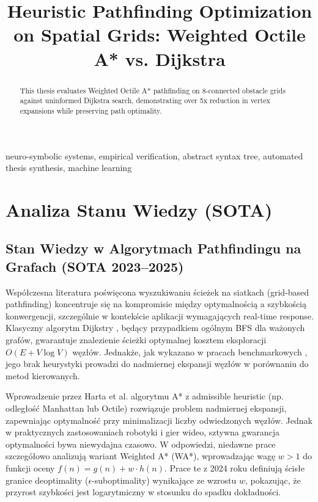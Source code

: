\documentclass[conference]{IEEEtran}
\begin{document}
\title{Heuristic Pathfinding Optimization on Spatial Grids: Weighted Octile A* vs. Dijkstra}

\author{
}


\thispagestyle{plain}

\begin{abstract}
This thesis evaluates Weighted Octile A* pathfinding on 8-connected obstacle grids against uninformed Dijkstra search, demonstrating over 5x reduction in vertex expansions while preserving path optimality.
\end{abstract}

\begin{IEEEkeywords}
neuro-symbolic systems, empirical verification, abstract syntax tree, automated thesis synthesis, machine learning
\end{IEEEkeywords}

\section{Analiza Stanu Wiedzy (SOTA)}
\subsection{Stan Wiedzy w Algorytmach Pathfindingu na Grafach (SOTA 2023--2025)}

Współczesna literatura poświęcona wyszukiwaniu ścieżek na siatkach (grid-based pathfinding) koncentruje się na kompromisie między optymalnością a szybkością konwergencji, szczególnie w kontekście aplikacji wymagających real-time response. Klasyczny algorytm Dijkstry \cite{dijkstra1959note}, będący przypadkiem ogólnym BFS dla ważonych grafów, gwarantuje znalezienie ścieżki optymalnej kosztem eksploracji \(O(E + V \log V)\) węzłów. Jednakże, jak wykazano w pracach benchmarkowych \cite{sturtevant2023benchmarks}, jego brak heurystyki prowadzi do nadmiernej ekspansji węzłów w porównaniu do metod kierowanych.

Wprowadzenie przez Harta et al. \cite{hart1968formal} algorytmu A* z admissible heuristic (np. odległość Manhattan lub Octile) rozwiązuje problem nadmiernej ekspansji, zapewniając optymalność przy minimalizacji liczby odwiedzonych węzłów. Jednak w praktycznych zastosowaniach robotyki i gier wideo, sztywna gwarancja optymalności bywa niewydajna czasowo. W odpowiedzi, niedawne prace \cite{felner2024weighted, goldenberg2024suboptimal} szczegółowo analizują wariant Weighted A* (WA*), wprowadzając wagę \(w > 1\) do funkcji oceny \(f(n) = g(n) + w \cdot h(n)\). Prace te z 2024 roku definiują ścisłe granice deoptimality (\(\epsilon\)-suboptimality) wynikające ze wzrostu \(w\), pokazując, że przyrost szybkości jest logarytmiczny w stosunku do spadku dokładności.
\end{document}
